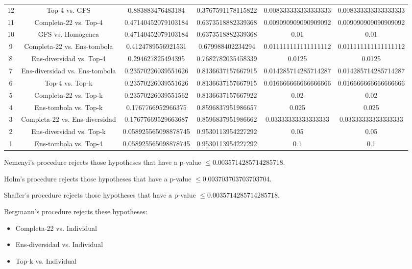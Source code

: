 \documentclass[a4paper,10pt]{article}
\begin{document}
\begin{landscape}
\begin{table}[!htp]
\begin{tabular}{cccccc}
12&Top-4 vs. GFS&0.883883476483184&0.3767591178115822&0.008333333333333333&0.008333333333333333\\
11&Completa-22 vs. Top-4&0.47140452079103184&0.6373518882339368&0.009090909090909092&0.009090909090909092\\
10&GFS vs. Homogenea&0.47140452079103184&0.6373518882339368&0.01&0.01\\
9&Completa-22 vs. Ens-tombola&0.4124789556921531&0.679988402234294&0.011111111111111112&0.011111111111111112\\
8&Ens-diversidad vs. Top-4&0.294627825494395&0.7682782035458339&0.0125&0.0125\\
7&Ens-diversidad vs. Ens-tombola&0.23570226039551626&0.8136637157667915&0.014285714285714287&0.014285714285714287\\
6&Top-4 vs. Top-k&0.23570226039551626&0.8136637157667915&0.016666666666666666&0.016666666666666666\\
5&Completa-22 vs. Top-k&0.23570226039551562&0.8136637157667922&0.02&0.02\\
4&Ens-tombola vs. Top-k&0.1767766952966375&0.8596837951986657&0.025&0.025\\
3&Completa-22 vs. Ens-diversidad&0.17677669529663687&0.8596837951986662&0.03333333333333333&0.03333333333333333\\
2&Ens-diversidad vs. Top-k&0.058925565098878745&0.9530113954227292&0.05&0.05\\
1&Ens-tombola vs. Top-4&0.058925565098878745&0.9530113954227292&0.1&0.1\\
\hline
\end{tabular}
\end{table}
Nemenyi's procedure rejects those hypotheses that have a p-value $\le0.0035714285714285718$.


Holm's procedure rejects those hypotheses that have a p-value $\le0.003703703703703704$.


Shaffer's procedure rejects those hypotheses that have a p-value $\le0.0035714285714285718$.


Bergmann's procedure rejects these hypotheses:


\begin{itemize}


\item Completa-22 vs. Individual
\item Ens-diversidad vs. Individual
\item Top-k vs. Individual
\end{itemize}



\end{landscape}
\end{document}
